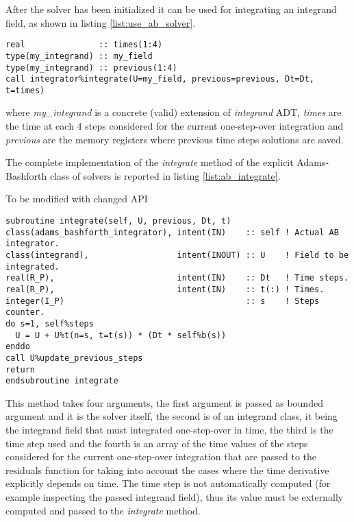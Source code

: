 \documentclass[pdftex,preprint,3p,times,numbers]{elsarticle}
\begin{document}
After the solver has been initialized it can be used for integrating an integrand field, as shown in listing \ref{list:use_ab_solver}.

\begin{lstlisting}[firstnumber=1,style=code,caption={example of usage of an Adams-Bashforth integrator},label={list:use_ab_solver}]
real               :: times(1:4)
type(my_integrand) :: my_field
type(my_integrand) :: previous(1:4)
call integrator%integrate(U=my_field, previous=previous, Dt=Dt, t=times)
\end{lstlisting}
where \emph{my\_integrand} is a concrete (valid) extension of \emph{integrand} ADT, \emph{times} are the time at each 4 steps considered for the current one-step-over integration and \emph{previous} are the memory registers where previous time steps solutions are saved.

The complete implementation of the \emph{integrate} method of the explicit Adams-Bashforth class of solvers is reported in listing \ref{list:ab_integrate}.

{\color{red} To be modified with changed API}

\begin{lstlisting}[firstnumber=1,style=code,caption={implementation of the \emph{integrate} method of explicit Adams-Bashforth class},label={list:ab_integrate}]
subroutine integrate(self, U, previous, Dt, t)
class(adams_bashforth_integrator), intent(IN)    :: self ! Actual AB integrator.
class(integrand),                  intent(INOUT) :: U    ! Field to be integrated.
real(R_P),                         intent(IN)    :: Dt   ! Time steps.
real(R_P),                         intent(IN)    :: t(:) ! Times.
integer(I_P)                                     :: s    ! Steps counter.
do s=1, self%steps
  U = U + U%t(n=s, t=t(s)) * (Dt * self%b(s))
enddo
call U%update_previous_steps
return
endsubroutine integrate
\end{lstlisting}

This method takes four arguments, the first argument is passed as bounded argument and it is the solver itself, the second is of an integrand class, it being the integrand field that must integrated one-step-over in time, the third is the time step used and the fourth is an array of the time values of the steps considered for the current one-step-over integration that are passed to the residuals function for taking into account the cases where the time derivative explicitly depends on time. The time step is not automatically computed (for example inspecting the passed integrand field), thus its value must be externally computed and passed to the \emph{integrate} method.
\end{document}
